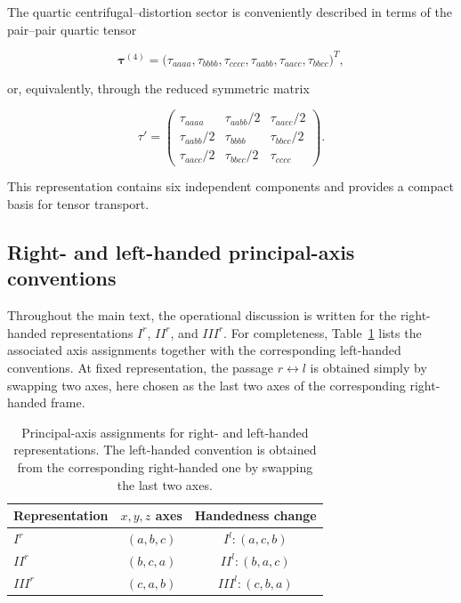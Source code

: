 \documentclass[aip,jcp,reprint,floatfix]{revtex4-2}
\begin{document}
The quartic centrifugal–distortion sector is conveniently described
in terms of the pair–pair quartic tensor

\begin{equation}
\boldsymbol{\tau}^{(4)} =
\bigl(
\tau_{aaaa},\tau_{bbbb},\tau_{cccc},
\tau_{aabb},\tau_{aacc},\tau_{bbcc}
\bigr)^T ,
\end{equation}

or, equivalently, through the reduced symmetric matrix

\begin{equation}
\tau'=
\begin{pmatrix}
\tau_{aaaa} & \tau_{aabb}/2 & \tau_{aacc}/2 \\
\tau_{aabb}/2 & \tau_{bbbb} & \tau_{bbcc}/2 \\
\tau_{aacc}/2 & \tau_{bbcc}/2 & \tau_{cccc}
\end{pmatrix}.
\end{equation}

This representation contains six independent components and provides
a compact basis for tensor transport.

\subsection{Right- and left-handed principal-axis conventions}

Throughout the main text, the operational discussion is written for
the right-handed representations $I^r$, $II^r$, and $III^r$. For
completeness, Table~\ref{tab:appendix_handedness_axes} lists the
associated axis assignments together with the corresponding
left-handed conventions. At fixed representation, the passage
$r \leftrightarrow l$ is obtained simply by swapping two axes, here
chosen as the last two axes of the corresponding right-handed frame.

\begin{table}[h]
\centering
\caption{Principal-axis assignments for right- and left-handed
representations. The left-handed convention is obtained from the
corresponding right-handed one by swapping the last two axes.}
\begin{tabular}{lcc}
\hline
Representation & $x,y,z$ axes & Handedness change \\
\hline
$I^r$   & $(a,b,c)$ & $I^l:(a,c,b)$ \\
$II^r$  & $(b,c,a)$ & $II^l:(b,a,c)$ \\
$III^r$ & $(c,a,b)$ & $III^l:(c,b,a)$ \\
\hline
\end{tabular}
\label{tab:appendix_handedness_axes}
\end{table}
\end{document}
